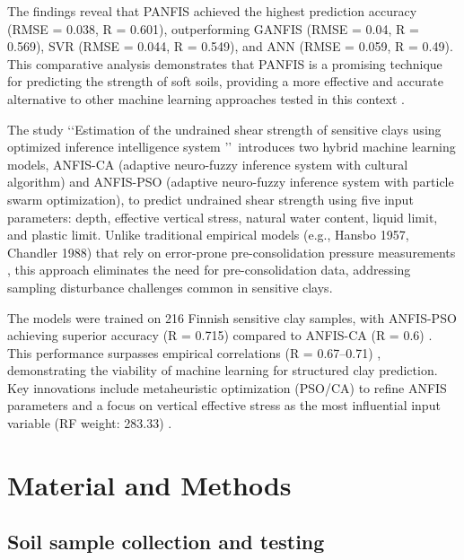 \documentclass[12pt,a4paper]{article}
\begin{document}
	The findings reveal that PANFIS achieved the highest prediction accuracy (RMSE = 0.038, R = 0.601), outperforming GANFIS (RMSE = 0.04, R = 0.569), SVR (RMSE = 0.044, R = 0.549), and ANN (RMSE = 0.059, R = 0.49). This comparative analysis demonstrates that PANFIS is a promising technique for predicting the strength of soft soils, providing a more effective and accurate alternative to other machine learning approaches tested in this context \cite{PHAM2018181}.
	
	The study \lq\lq Estimation of the undrained shear strength of sensitive clays using optimized inference intelligence system \rq\rq\  introduces two hybrid machine learning models, ANFIS-CA (adaptive neuro-fuzzy inference system with cultural algorithm) and ANFIS-PSO (adaptive neuro-fuzzy inference system with particle swarm optimization), to predict undrained shear strength using five input parameters: depth, effective vertical stress, natural water content, liquid limit, and plastic limit. Unlike traditional empirical models (e.g., Hansbo 1957, Chandler 1988) that rely on error-prone pre-consolidation pressure measurements \cite{Tran_Ho_Van_Le_Prakash_Pham_2022,20210135}, this approach eliminates the need for pre-consolidation data, addressing sampling disturbance challenges common in sensitive clays.
	
	The models were trained on 216 Finnish sensitive clay samples, with ANFIS-PSO achieving superior accuracy (R = 0.715) compared to ANFIS-CA (R = 0.6) \cite{Tran_Ho_Van_Le_Prakash_Pham_2022}. This performance surpasses empirical correlations (R = 0.67–0.71) \cite{20210135}, demonstrating the viability of machine learning for structured clay prediction. Key innovations include metaheuristic optimization (PSO/CA) to refine ANFIS parameters and a focus on vertical effective stress as the most influential input variable (RF weight: 283.33) \cite{Tran_Ho_Van_Le_Prakash_Pham_2022}.
	
	\section{Material and Methods}
	
	\subsection{Soil sample collection and testing}
	
\end{document}
